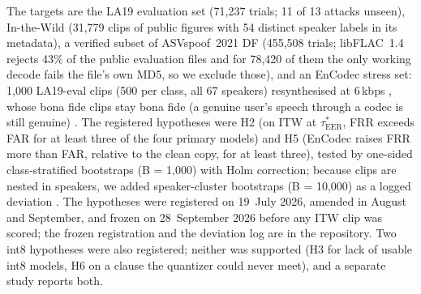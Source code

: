 \documentclass[journal]{IEEEtran}
\newcommand{\tauE}{\tau^{*}_{\mathrm{EER}}}
\begin{document}
The targets are the LA19 evaluation set (71,237 trials; 11 of 13 attacks unseen), In-the-Wild (31,779 clips of public
figures with 54 distinct speaker labels in its metadata), a verified subset of ASVspoof~2021 DF (455,508 trials; libFLAC~1.4
rejects 43\% of the public evaluation files and for 78,420 of them the only working decode fails the file's own MD5, so we
exclude those), and an EnCodec stress set: 1,000 LA19-eval clips (500 per class, all 67 speakers) resynthesised at 6\,kbps
\cite{defossez23_encodec}, whose bona fide clips stay bona fide (a genuine user's speech through a codec is still
genuine) \cite{wang25_asvspoof5_db,xiao26_resynth}. The registered hypotheses were H2 (on ITW at \(\tauE\), FRR exceeds FAR
for at least three of the four primary models) and H5 (EnCodec raises FRR more than FAR, relative to the clean copy, for
at least three), tested by one-sided class-stratified bootstraps (B = 1,000) with Holm correction; because clips are nested
in speakers, we added speaker-cluster bootstraps (B = 10,000) as a logged deviation \cite{field07_boot,bolle04_subsets}.
The hypotheses were registered on 19~July 2026, amended in August and September, and frozen on 28~September 2026 before any
ITW clip was scored; the frozen registration and the deviation log are in the repository. Two int8 hypotheses were also
registered; neither was supported (H3 for lack of usable int8 models, H6 on a clause the quantizer could never meet), and a
separate study reports both.
\end{document}
